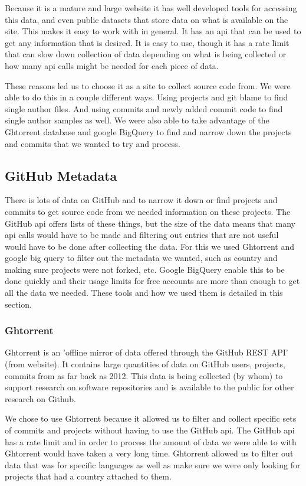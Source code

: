 \documentclass{article}
\begin{document}
Because it is a mature and large website it has well developed tools for accessing this data, and even public datasets that store data on what is available on the site. This makes it easy to work with in general. It has an api that can be used to get any information that is desired. It is easy to use, though it has a rate limit that can slow down collection of data depending on what is being collected or how many api calls might be needed for each piece of data.

These reasons led us to choose it as a site to collect source code from. We were able to do this in a couple different ways. Using projects and git blame to find single author files. And using commits and newly added commit code to find single author samples as well. We were also able to take advantage of the Ghtorrent database and google BigQuery to find and narrow down the projects and commits that we wanted to try and process.

\subsection{GitHub Metadata}
There is lots of data on GitHub and to narrow it down or find projects and commits to get source code from we needed information on these projects. The GitHub api offers lists of these things, but the size of the data means that many api calls would have to be made and filtering out entries that are not useful would have to be done after collecting the data. For this we used Ghtorrent and google big query to filter out the metadata we wanted, such as country and making sure projects were not forked, etc. Google BigQuery enable this to be done quickly and their usage limits for free accounts are more than enough to get all the data we needed. These tools and how we used them is detailed in this section.

\subsubsection{Ghtorrent}
Ghtorrent is an 'offline mirror of data offered through the GitHub REST API' (from website). It contains large quantities of data on GitHub users, projects, commits from as far back as 2012. This data is being collected (by whom) to support research on software repositories and is available to the public for other research on Github.

We chose to use Ghtorrent because it allowed us to filter and collect specific sets of commits and projects without having to use the GitHub api. The GitHub api has a rate limit and in order to process the amount of data we were able to with Ghtorrent would have taken a very long time. Ghtorrent allowed us to filter out data that was for specific languages as well as make sure we were only looking for projects that had a country attached to them.
\end{document}
